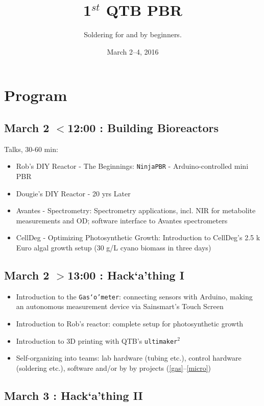 \documentclass[12pt,a4paper]{scrartcl}
\title{1$^{st}$ QTB PBR \hack{}}
\subtitle{Soldering for and by beginners.}
\date{March 2--4, 2016}
\newcommand{\hack}[0]{Hack`a'thing}
\newcommand{\gasometer}[0]{\texttt{Gas`o'meter}}
\begin{document}
\maketitle
\tableofcontents
\newpage


\section{Program}

\subsection*{March 2 $<$12:00 : Building Bioreactors}

Talks, 30-60 min:
\begin{itemize}
\item Rob's DIY Reactor - The Beginnings: \texttt{NinjaPBR} -
  Arduino-controlled mini PBR
\item Dougie's DIY Reactor - 20 yrs Later
\item Avantes - Spectrometry: Spectrometry applications, incl. NIR for
  metabolite measurements and OD; software interface to Avantes
  spectrometers
\item CellDeg - Optimizing Photosynthetic Growth: Introduction to
  CellDeg's 2.5 k Euro algal growth setup (30 g/L cyano
  biomass in three days)
\end{itemize}


\subsection*{March 2 $>$13:00 : \hack{} I}

\begin{itemize}
\item Introduction to the \gasometer{}: connecting sensors with Arduino,
  making an autonomous measurement device via Sainsmart's Touch Screen
\item Introduction to Rob's reactor: complete setup for photosynthetic growth
\item Introduction to 3D printing with QTB's \texttt{ultimaker$^2$}
\item Self-organizing into teams: lab hardware (tubing etc.), control hardware
(soldering etc.), software and/or by by projects (\ref{gas}--\ref{micro}) 
\end{itemize}

\subsection*{March 3 : \hack{} II}
\end{document}
